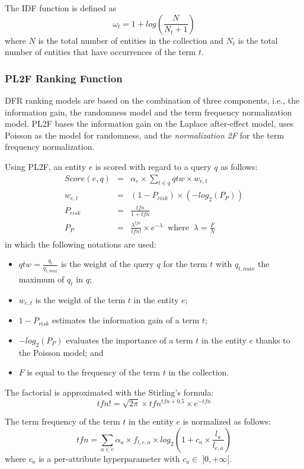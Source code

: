 The IDF function is defined as
$$
\omega_t=1+log\left(\frac{N}{N_t+1}\right)
$$
where $N$ is the total number of entities in the collection and $N_t$ is the total number of entities that have occurrences of the term $t$.

\subsubsection{PL2F Ranking Function}

DFR ranking models are based on the combination of three components, i.e., the information gain, the randomness model and the term frequency normalization model. PL2F bases the information gain on the Laplace after-effect model, uses Poisson as the model for randomness, and the \emph{normalization 2F} for the term frequency normalization.

Using PL2F, an entity $e$ is scored with regard to a query $q$ as follows:
\begin{eqnarray*}
	Score(e,q) & = & \alpha_e\times\sum_{t\in q}{qtw \times w_{e,t}}\\
	\label{eq:dfr-score}
	w_{e,t} & = & \left(1-P_{risk}\right) \times \left(-log_2\left(P_{P}\right)\right) \\
	\label{eq:dfr-term-weight}
	P_{risk} & = & \frac{tfn}{1+tfn} \\
	\label{eq:dfr-prisk}
	P_{P} & = & \frac{\lambda^{tfn}}{tfn!}\times e^{-\lambda} \:\text{ where }\: \lambda=\frac{F}{N} \\
	\label{eq:dfr:rand-poisson}
\end{eqnarray*}
in which the following notations are used:
\begin{itemize}
	\item $qtw=\frac{q_t}{q_{t,max}}$ is the weight of the query $q$ for the term $t$ with $q_{t,max}$ the maximum of $q_t$ in $q$;
	\item $w_{e,t}$ is the weight of the term $t$ in the entity $e$;
	\item $1-P_{risk}$ estimates the information gain of a term $t$;
	\item $-log_2\left(P_{P}\right)$ evaluates the importance of a term $t$ in the entity $e$ thanks to the Poisson model; and
	\item $F$ is equal to the frequency of the term $t$ in the collection.
\end{itemize}

The factorial is approximated with the Stirling's formula:
$$
tfn!=\sqrt{2\pi}\times tfn^{tfn+0.5}\times e^{-tfn}
$$

The term frequency of the term $t$ in the entity $e$ is normalized as follows:
\begin{equation}
tfn = \sum_{a\in e}{\alpha_a\times f_{t,e,a} \times log_2\left(1+c_a\times\frac{l_a}{l_{e,a}}\right)}
\label{eq:pl2f}
\end{equation}
where $c_a$ is a per-attribute hyperparameter with $c_a \in\;]0,+\infty[$.

